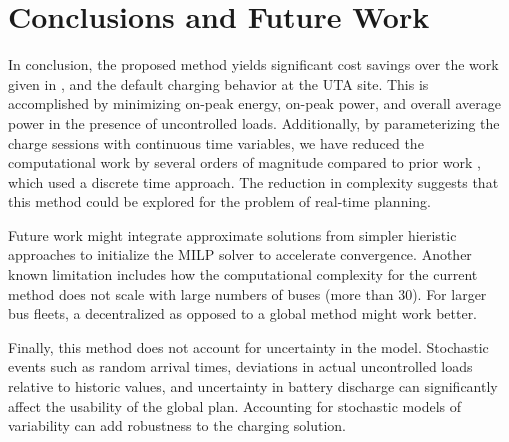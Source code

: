 \section{Conclusions and Future Work }
In conclusion, the proposed method yields significant cost savings over the work given in \cite{He_2019_Fast}, and the default charging behavior at the UTA site. This is accomplished by minimizing on-peak energy, on-peak power, and overall average power in the presence of uncontrolled loads. Additionally, by parameterizing the charge sessions with continuous time variables, we have reduced the computational work by several orders of magnitude compared to prior work \cite{mortensen_comprehensive_2021}, which used a discrete time approach. The reduction in complexity suggests that this method could be explored for the problem of real-time planning. 
\par Future work might integrate approximate solutions from simpler hieristic approaches to initialize the MILP solver to accelerate convergence. Another known limitation includes how the computational complexity for the current method does not scale with large numbers of buses (more than 30). For larger bus fleets, a decentralized as opposed to a global method might work better. 
\par Finally, this method does not account for uncertainty in the model.  Stochastic events such as random arrival times, deviations in actual uncontrolled loads relative to historic values, and uncertainty in battery discharge can significantly affect the usability of the global plan. Accounting for stochastic models of variability can add robustness to the charging solution. 
